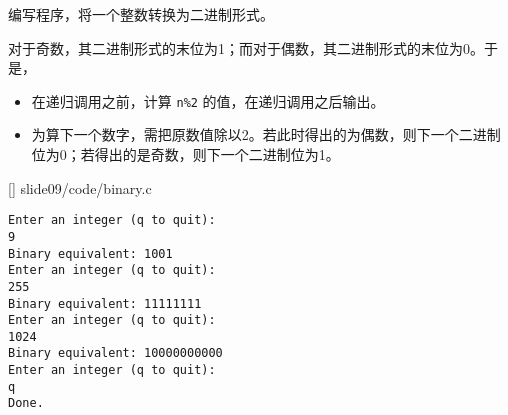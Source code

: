 \begin{frame}[fragile]
  \begin{free}[例]{}
    编写程序，将一个整数转换为二进制形式。
  \end{free} \pause 

对于奇数，其二进制形式的末位为1；而对于偶数，其二进制形式的末位为0。于是， \pause 




\begin{free}[规律]{}
\begin{itemize}
\item 
在递归调用之前，计算 \lstinline|n%2| 的值，在递归调用之后输出。\\[0.1in]
\item
为算下一个数字，需把原数值除以2。若此时得出的为偶数，则下一个二进制位为0；若得出的是奇数，则下一个二进制位为1。
\end{itemize}  
\end{free}

\end{frame}

\begin{frame}

[]
{slide09/code/binary.c}
\end{frame}



\begin{frame}[fragile]
\begin{lstlisting}[backgroundcolor=\color{red!10}]
Enter an integer (q to quit):
9
Binary equivalent: 1001
Enter an integer (q to quit):
255
Binary equivalent: 11111111
Enter an integer (q to quit):
1024
Binary equivalent: 10000000000
Enter an integer (q to quit):
q
Done.
\end{lstlisting}
\end{frame}



